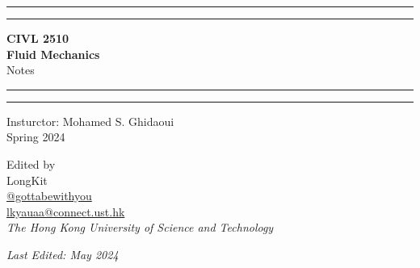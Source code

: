 \documentclass[twoside]{article}
\numberwithin{equation}{section}
\begin{document}
	\begin{titlepage}
		\centering
		\scshape
		\vspace*{\baselineskip}
		
		\rule{\textwidth}{1.6pt}\vspace{-\baselineskip}\vspace{2pt} %
		\rule{\textwidth}{0.4pt} %
		
		\vspace{0.5\baselineskip}
		
		{\LARGE \textbf{CIVL 2510 \\ Fluid Mechanics} \\
			
			\vspace{0.75\baselineskip}
			\Large Notes}
		
		\vspace{0.5\baselineskip}
		
		\rule{\textwidth}{0.4pt}\vspace{-\baselineskip}\vspace{3.2pt} %
		\rule{\textwidth}{1.6pt} %
		
		\vspace{1.5\baselineskip}
		
		{\large Insturctor: Mohamed S. Ghidaoui \\
			\vspace{0.5\baselineskip} Spring 2024}
		
		\vspace{\baselineskip}
		
		{\Large Edited by \\
			\vspace{0.5\baselineskip}
			\Large LongKit \\
			\vspace{0.5\baselineskip}
			\small \normalfont \href{https://github.com/gottabewithyou}{\faGithub \hspace{2.5pt} @gottabewithyou} \\
			\small \normalfont \href{mailto:lkyauaa@connect.ust.hk}{\faEnvelope \hspace{2.5pt} lkyauaa@connect.ust.hk} \\
			\vspace{10pt}
			\large \textit{The Hong Kong University of Science and Technology}}
		
		\vspace{10\baselineskip}
		
		\textit{Last Edited: May 2024}
		
	\end{titlepage}
	
\end{document}
